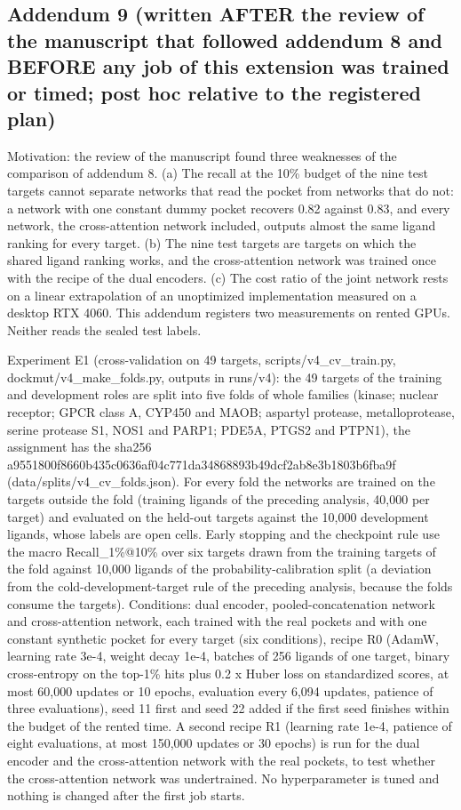 \subsection*{Addendum 9 (written AFTER the review of the manuscript that followed addendum 8 and BEFORE any job of this extension was trained or timed; post hoc relative to the registered plan)}

Motivation: the review of the manuscript found three weaknesses of the comparison of addendum 8. (a) The recall at the 10\% budget of the nine test targets cannot separate networks that read the pocket from networks that do not: a network with one constant dummy pocket recovers 0.82 against 0.83, and every network, the cross-attention network included, outputs almost the same ligand ranking for every target. (b) The nine test targets are targets on which the shared ligand ranking works, and the cross-attention network was trained once with the recipe of the dual encoders. (c) The cost ratio of the joint network rests on a linear extrapolation of an unoptimized implementation measured on a desktop RTX 4060. This addendum registers two measurements on rented GPUs. Neither reads the sealed test labels.

Experiment E1 (cross-validation on 49 targets, scripts/v4\_cv\_train.py, dockmut/v4\_make\_folds.py, outputs in runs/v4): the 49 targets of the training and development roles are split into five folds of whole families (kinase; nuclear receptor; GPCR class A, CYP450 and MAOB; aspartyl protease, metalloprotease, serine protease S1, NOS1 and PARP1; PDE5A, PTGS2 and PTPN1), the assignment has the sha256 a9551800f8660b435c0636af04c771da34868893b49dcf2ab8e3b1803b6fba9f (data/splits/v4\_cv\_folds.json). For every fold the networks are trained on the targets outside the fold (training ligands of the preceding analysis, 40,000 per target) and evaluated on the held-out targets against the 10,000 development ligands, whose labels are open cells. Early stopping and the checkpoint rule use the macro Recall\_1\%@10\% over six targets drawn from the training targets of the fold against 10,000 ligands of the probability-calibration split (a deviation from the cold-development-target rule of the preceding analysis, because the folds consume the targets). Conditions: dual encoder, pooled-concatenation network and cross-attention network, each trained with the real pockets and with one constant synthetic pocket for every target (six conditions), recipe R0 (AdamW, learning rate 3e-4, weight decay 1e-4, batches of 256 ligands of one target, binary cross-entropy on the top-1\% hits plus 0.2 x Huber loss on standardized scores, at most 60,000 updates or 10 epochs, evaluation every 6,094 updates, patience of three evaluations), seed 11 first and seed 22 added if the first seed finishes within the budget of the rented time. A second recipe R1 (learning rate 1e-4, patience of eight evaluations, at most 150,000 updates or 30 epochs) is run for the dual encoder and the cross-attention network with the real pockets, to test whether the cross-attention network was undertrained. No hyperparameter is tuned and nothing is changed after the first job starts.


